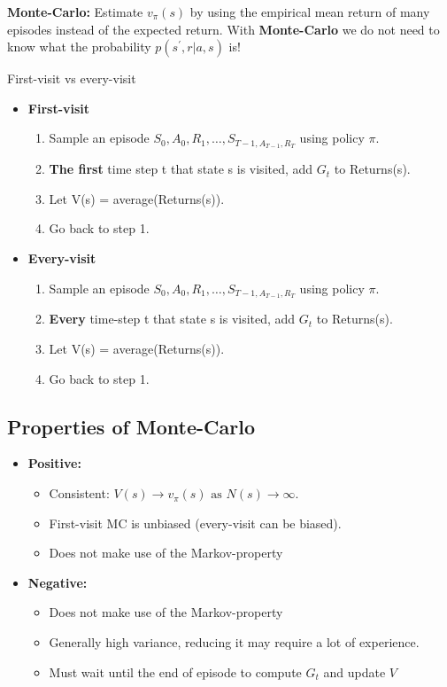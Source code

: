\textbf{Monte-Carlo: } Estimate $v_\pi(s)$ by using the empirical mean return of many episodes instead of the expected return. With \textbf{Monte-Carlo} we do not need to know what the probability $p(s^{\prime},r|a,s)$ is!

\begin{wbox}{First-visit vs every-visit}
\begin{itemize}
	\item \textbf{First-visit}
		\begin{enumerate}
			\item Sample an episode $S_0,A_0,R_1,\ldots,S_{T-1, A_{T-1},R_T}$ using policy $\pi$.
			\item \textbf{The first} time step t that state s is visited, add $G_t$ to Returns(s).
			\item Let V(s) = average(Returns(s)).
			\item Go back to step 1.
		\end{enumerate}
	\item \textbf{Every-visit}
		\begin{enumerate}
			\item Sample an episode $S_0,A_0,R_1,\ldots,S_{T-1, A_{T-1},R_T}$ using policy $\pi$.
			\item \textbf{Every} time-step t that state s is visited, add $G_t$ to Returns(s).
			\item Let V(s) = average(Returns(s)).
			\item Go back to step 1.
		\end{enumerate}
\end{itemize}
\end{wbox}


\subsection*{Properties of Monte-Carlo}
\begin{itemize}
	\item \textbf{Positive: }
		\begin{itemize}
			\item Consistent: $V(s) \rightarrow v_\pi(s) \text{ as } N(s) \rightarrow \infty$.
			\item First-visit MC is unbiased (every-visit can be biased).
			\item Does not make use of the Markov-property
		\end{itemize}
	\item \textbf{Negative: }
	\begin{itemize}
		\item Does not make use of the Markov-property
		\item Generally high variance, reducing it may require a lot of experience.
		\item Must wait until the end of episode to compute $G_t$ and update $V$
	\end{itemize}
\end{itemize}

